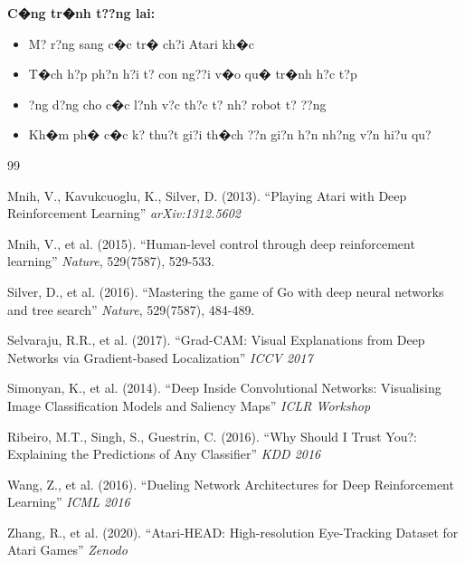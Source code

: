 \documentclass[11pt,a4paper]{article}
\begin{document}
\textbf{C�ng tr�nh t??ng lai:}
\begin{itemize}
    \item M? r?ng sang c�c tr� ch?i Atari kh�c
    \item T�ch h?p ph?n h?i t? con ng??i v�o qu� tr�nh h?c t?p
    \item ?ng d?ng cho c�c l?nh v?c th?c t? nh? robot t? ??ng
    \item Kh�m ph� c�c k? thu?t gi?i th�ch ??n gi?n h?n nh?ng v?n hi?u qu?
\end{itemize}


\begin{thebibliography}{99}

Mnih, V., Kavukcuoglu, K., Silver, D. (2013). 
``Playing Atari with Deep Reinforcement Learning''
\textit{arXiv:1312.5602}

Mnih, V., et al. (2015).
``Human-level control through deep reinforcement learning''
\textit{Nature}, 529(7587), 529-533.

Silver, D., et al. (2016).
``Mastering the game of Go with deep neural networks and tree search''
\textit{Nature}, 529(7587), 484-489.

Selvaraju, R.R., et al. (2017).
``Grad-CAM: Visual Explanations from Deep Networks via Gradient-based Localization''
\textit{ICCV 2017}

Simonyan, K., et al. (2014).
``Deep Inside Convolutional Networks: Visualising Image Classification Models and Saliency Maps''
\textit{ICLR Workshop}

Ribeiro, M.T., Singh, S., Guestrin, C. (2016).
``Why Should I Trust You?: Explaining the Predictions of Any Classifier''
\textit{KDD 2016}

Wang, Z., et al. (2016).
``Dueling Network Architectures for Deep Reinforcement Learning''
\textit{ICML 2016}

Zhang, R., et al. (2020).
``Atari-HEAD: High-resolution Eye-Tracking Dataset for Atari Games''
\textit{Zenodo}

\end{thebibliography}
\end{document}
